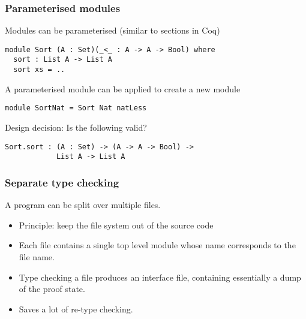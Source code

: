 \documentclass{beamer}
\newenvironment{agda}{
\begin{block}{}\small
}{
\end{block}
}
\begin{document}
\begin{frame}[fragile]
  \frametitle{Parameterised modules}

  Modules can be parameterised (similar to sections in Coq)

\begin{agda}
\begin{verbatim}
module Sort (A : Set)(_<_ : A -> A -> Bool) where
  sort : List A -> List A
  sort xs = ..
\end{verbatim}
\end{agda}

  A parameterised module can be applied to create a new module

\begin{agda}
\begin{verbatim}
module SortNat = Sort Nat natLess
\end{verbatim}
\end{agda}

  Design decision: Is the following valid?

\begin{agda}
\begin{verbatim}
Sort.sort : (A : Set) -> (A -> A -> Bool) ->
            List A -> List A
\end{verbatim}
\end{agda}

\end{frame}


\begin{frame}[fragile]
  \frametitle{Separate type checking}

  A program can be split over multiple files.
  \begin{itemize}
    \item Principle: keep the file system out of the source code
    \item Each file contains a single top level module whose name corresponds to
    the file name.
    \item Type checking a file produces an interface file, containing
    essentially a dump of the proof state.
    \item Saves a lot of re-type checking.
  \end{itemize}
\end{frame}

\end{document}
